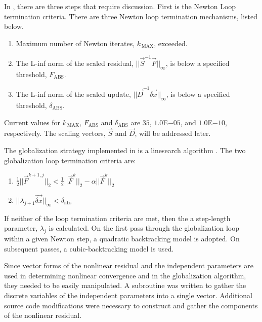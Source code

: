 In , there are three steps that require discussion.
First is the Newton Loop termination criteria.
There are three Newton loop termination mechanisms, listed below.

\begin{enumerate}
\item{Maximum number of Newton iterates, $k_{\,\text{MAX}}$, exceeded.}
\item{The L-inf norm of the scaled residual, $||\vec{S}^{-1}\vec{F}||_{\infty}$, is below a specified threshold, $F_{\text{ABS}}$.}
\item{The L-inf norm of the scaled update, $||\vec{D}^{-1}\vec{\delta x}||_{\infty}$, is below a specified threshold, $\delta_{\text{ABS}}$.}
\end{enumerate}

Current values for $k_{\,\text{MAX}}$, $F_{\text{ABS}}$ and $\delta_{\text{ABS}}$ are $35$, $1.0$E$-05$, and $1.0$E$-10$, respectively.
The scaling vectors, $\vec{S}$ and $\vec{D}$, will be addressed later.

The globalization strategy implemented in \cobra{} is a linesearch algorithm \cite{Dennis1996}.
The two globalization loop termination criteria are:

\begin{enumerate}
\item{$\frac{1}{2}||\vec{F}^{k+1, j}||_{2} < \frac{1}{2}||\vec{F}^{k}||_{2} - \alpha ||\vec{F}^{k}||_{2}$ }
\item{$||\lambda_{j+1} \vec{\delta x}||_{\infty} < \delta_{\text{abs}}$}
\end{enumerate}

If neither of the loop termination criteria are met, then the a step-length parameter, $\lambda_j$ is calculated.
On the first pass through the globalization loop within a given Newton step, a quadratic backtracking model is adopted.
On subsequent passes, a cubic-backtracking model is used.
 
Since vector forms of the nonlinear residual and the independent parameters are used in determining nonlinear convergence and in the globalization algorithm, they needed to be easily manipulated.
A subroutine was written to gather the discrete variables of the independent parameters into a single vector.
Additional source code modifications were necessary to construct and gather the components of the nonlinear residual.


